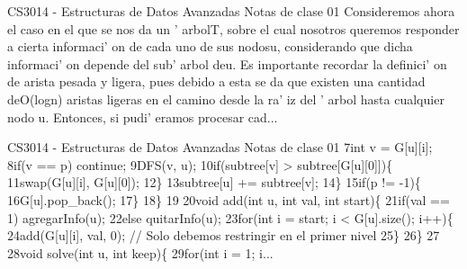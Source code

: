 \begin{description}[leftmargin=!,labelwidth=4.2em,style=nextline]
\item[Pag. 5] CS3014 - Estructuras de Datos Avanzadas Notas de clase 01 Consideremos ahora el caso en el que se nos da un ' arbolT, sobre el cual nosotros queremos responder a cierta informaci' on de cada uno de sus nodosu, considerando que dicha informaci' on depende del sub' arbol deu. Es importante recordar la definici' on de arista pesada y ligera, pues debido a esta se da que existen una cantidad deO(logn) aristas ligeras en el camino desde la ra' iz del ' arbol hasta cualquier nodo u. Entonces, si pudi' eramos procesar cad...
\item[Pag. 6] CS3014 - Estructuras de Datos Avanzadas Notas de clase 01 7int v = G[u][i]; 8if(v == p) continue; 9DFS(v, u); 10if(subtree[v] > subtree[G[u][0]])\{ 11swap(G[u][i], G[u][0]); 12\} 13subtree[u] += subtree[v]; 14\} 15if(p != -1)\{ 16G[u].pop\_back(); 17\} 18\} 19 20void add(int u, int val, int start)\{ 21if(val == 1) agregarInfo(u); 22else quitarInfo(u); 23for(int i = start; i < G[u].size(); i++)\{ 24add(G[u][i], val, 0); // Solo debemos restringir en el primer nivel 25\} 26\} 27 28void solve(int u, int keep)\{ 29for(int i = 1; i...
\end{description}
